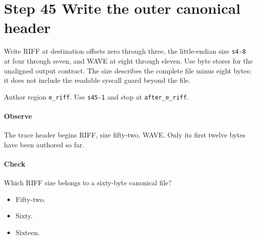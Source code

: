 \section{Step 45 Write the outer canonical header}\label{pcm-wav-s45}
Write RIFF at destination offsets zero through three, the little-endian size \texttt{s4-8} at four through seven, and WAVE at eight through eleven. Use byte stores for the unaligned output contract. The size describes the complete file minus eight bytes; it does not include the readable syscall guard beyond the file.

Author region \texttt{e\_riff}. Use \texttt{s45-1} and stop at \texttt{after\_e\_riff}.

\paragraph{Observe} The trace header begins RIFF, size fifty-two, WAVE. Only its first twelve bytes have been authored so far.

\paragraph{Check} Which RIFF size belongs to a sixty-byte canonical file?
\begin{itemize}
\item[A.] Fifty-two.
\item[B.] Sixty.
\item[C.] Sixteen.
\end{itemize}
